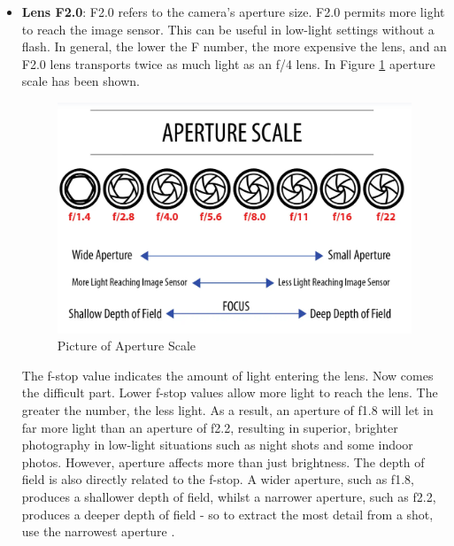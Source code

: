\begin{itemize}
    \item  \textbf{Lens F2.0}: F2.0 refers to the camera's aperture size. F2.0 permits more light to reach the image sensor. This can be useful in low-light settings without a flash. In general, the lower the F number, the more expensive the lens, and an F2.0 lens transports twice as much light as an f/4 lens. In Figure \ref{fig:Aperture Scale} aperture scale has been shown.  
\begin{figure}[H]
  \centering
  \includegraphics[width= 1.0\textwidth]{Figures/Aperture Scale.PNG}
  \caption[Picture of Aperture Scale]{Picture of Aperture Scale \cite{ApertureScale}}
  \label{fig:Aperture Scale}
\end{figure}
    
    The f-stop value indicates the amount of light entering the lens. Now comes the difficult part. Lower f-stop values allow more light to reach the lens. The greater the number, the less light. As a result, an aperture of f1.8 will let in far more light than an aperture of f2.2, resulting in superior, brighter photography in low-light situations such as night shots and some indoor photos. However, aperture affects more than just brightness. The depth of field is also directly related to the f-stop. A wider aperture, such as f1.8, produces a shallower depth of field, whilst a narrower aperture, such as f2.2, produces a deeper depth of field - so to extract the most detail from a shot, use the narrowest aperture \cite{lens}.



\end{itemize}

